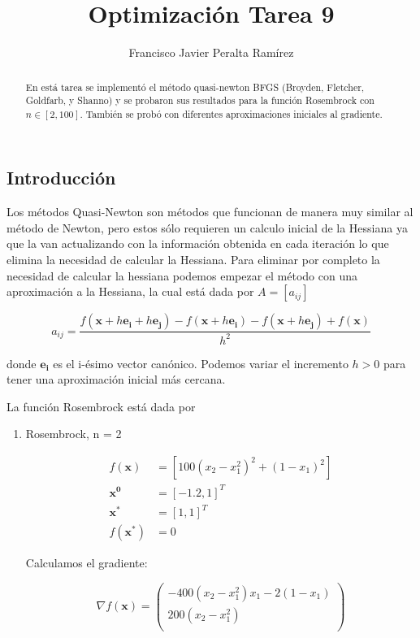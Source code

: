 \documentclass{article}
\title {Optimización Tarea 9}
\author {Francisco Javier Peralta Ramírez}
\begin{document}
\maketitle
\begin{abstract}
  En está tarea se implementó el método quasi-newton BFGS (Broyden, Fletcher, Goldfarb, y Shanno) y se probaron sus resultados para la función Rosembrock con $n \in [2, 100]$. También se probó con diferentes aproximaciones iniciales al gradiente.
\end{abstract}
\begin{multicols}{2}

\section{Introducción}

Los métodos Quasi-Newton son métodos que funcionan de manera muy similar al método de Newton, pero estos sólo requieren un calculo inicial de la Hessiana ya que la van actualizando con la información obtenida en cada iteración lo que elimina la necesidad de calcular la Hessiana. Para eliminar por completo la necesidad de calcular la hessiana podemos empezar el método con una aproximación a la Hessiana, la cual está dada por $A = [a_{ij}]$

{
\small
$$a_{ij} = \frac{f(\boldsymbol{x} + h\boldsymbol{e_i} + h\boldsymbol{e_j}) - f(\boldsymbol{x} + h\boldsymbol{e_i}) - f(\boldsymbol{x} + h\boldsymbol{e_j}) + f(\boldsymbol{x}) }{h^2} $$
}

donde $\boldsymbol{e_i}$ es el i-ésimo vector canónico. Podemos variar el incremento $h > 0$ para tener una aproximación inicial más cercana.

La función Rosembrock está dada por

\begin{enumerate}

\item Rosembrock, n = 2

\begin{align*} 
f(\boldsymbol{x}) &= [100 (x_2 - x_1^2)^2 + (1 - x_1)^2] \\
\boldsymbol{x^0} &= [-1.2, 1]^T \\
\boldsymbol{x^*} &= [1, 1]^T \\
f(\boldsymbol{x^*}) &= 0
\end{align*}

Calculamos el gradiente:

$$\nabla f(\boldsymbol{x}) = 
 \begin{pmatrix}
  -400(x_2 - x_1^2)x_1 - 2(1 - x_1) \\
  200(x_2 - x_1^2)\\
 \end{pmatrix}
$$


\end{enumerate}
\end{multicols}
\end{document}
